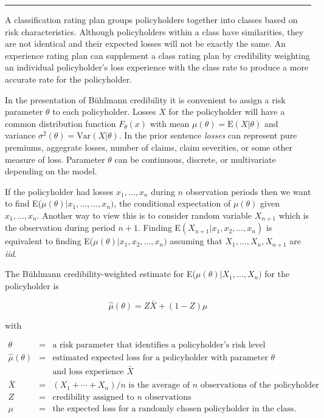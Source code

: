 \documentclass[]{book}
\theoremstyle{definition}
\theoremstyle{definition}
\theoremstyle{definition}
\theoremstyle{remark}
\begin{document}
\begin{center}\rule{0.5\linewidth}{\linethickness}\end{center}

A classification rating plan groups policyholders together into classes
based on risk characteristics. Although policyholders within a class
have similarities, they are not identical and their expected losses will
not be exactly the same. An experience rating plan can supplement a
class rating plan by credibility weighting an individual policyholder's
loss experience with the class rate to produce a more accurate rate for
the policyholder.

In the presentation of Bühlmann credibility it is convenient to assign a
risk parameter \(\theta\) to each policyholder. Losses \(X\) for the
policyholder will have a common distribution function \(F_{\theta}(x)\)
with mean \(\mu(\theta)=\mathrm{E}(X|\theta)\) and variance
\(\sigma^2(\theta)=\mathrm{Var}(X|\theta)\). In the prior sentence
\emph{losses} can represent pure premiums, aggegrate losses, number of
claims, claim severities, or some other measure of loss. Parameter
\(\theta\) can be continuous, discrete, or multivariate depending on the
model.

If the policyholder had losses \(x_1, \ldots, x_n\) during \(n\)
observation periods then we want to find
E(\(\mu(\theta)|x_1,\ldots,\ldots, x_n)\), the conditional expectation
of \(\mu(\theta)\) given \(x_1,\ldots, x_n\). Another way to view this
is to consider random variable \(X_{n+1}\) which is the observation
during period \(n+1\). Finding E\((X_{n+1}|x_1, x_2,\ldots, x_n)\) is
equivalent to finding E(\(\mu(\theta)|x_1, x_2,\ldots, x_n)\) assuming
that \(X_1,\ldots, X_n, X_{n+1}\) are \emph{iid}.

The Bühlmann credibility-weighted estimate for
E(\(\mu(\theta)|X_1,\ldots, X_n)\) for the policyholder is

\begin{equation}
\hat{\mu}(\theta)=Z\bar{X}+(1-Z)\mu 
\label{eq:buhlcred}
\end{equation}

with

\begin{eqnarray*} 
\theta&=&\textrm{a risk parameter that identifies a policyholder's risk level}\\
\hat{\mu}(\theta)&=&\textrm{estimated expected loss for a policyholder with parameter }\theta\\
 & & \textrm{and loss experience } \bar{X}\\
\bar{X}&=&(X_1+\cdots+X_n)/n \textrm{ is the average of $n$ observations of the policyholder } \\
 Z&=&\textrm{credibility assigned to $n$ observations } \\
\mu&=&\textrm{the expected loss for a randomly chosen policyholder in the class.}\\
\end{eqnarray*}
\end{document}
